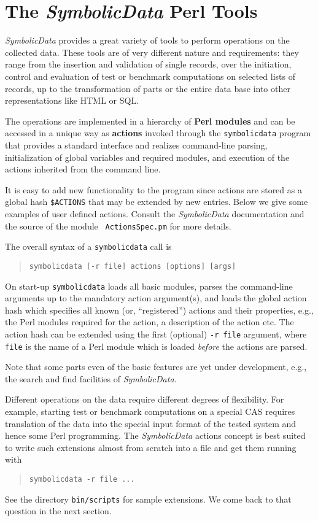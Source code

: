 \documentclass[11pt]{article}
\newcommand{\SD}{{\em Symbo\-lic\-Data}}
\begin{document}
\section{The {\SD} Perl Tools}

{\SD} provides a great variety of tools to perform operations on the
collected data. These tools are of very different nature and
requirements: they range from the insertion and validation of single
records, over the initiation, control and evaluation of test or
benchmark computations on selected lists of records, up to the
transformation of parts or the entire data base into other
representations like HTML or SQL.

The operations are implemented in a hierarchy of {\bf Perl modules}
and can be accessed in a unique way as {\bf actions} invoked through
the {\tt symbolicdata} program that provides a standard interface and
realizes command-line parsing, initialization of global variables and
required modules, and execution of the actions inherited from the
command line.

It is easy to add new functionality to the program since actions are
stored as a global hash {\tt \$ACTIONS} that may be extended by new
entries.  Below we give some examples of user defined actions.
Consult the {\SD} documentation and the source of the module {\tt
ActionsSpec.pm} for more details.

The overall syntax of a {\tt symbolicdata} call is
\begin{quote}
\mbox{\tt symbolicdata [-r file] actions [options] [args]}
\end{quote}

On start-up {\tt symbolicdata} loads all basic modules, parses
the command-line arguments up to the mandatory action
argument(s), and loads the global action hash which specifies all
known (or, ``registered'') actions and their properties, e.g.,
the Perl modules required for the action, a description of the
action etc. The action hash can be extended using the first
(optional) {\tt -r file} argument, where {\tt file} is the name
of a Perl module which is loaded {\em before} the actions are
parsed.  

Note that some parts even of the basic features are yet
under development, e.g., the search and find facilities of \SD.

Different operations on the data require different degrees of
flexibility. For example, starting test or benchmark computations
on a special CAS requires translation of the data into the
special input format of the tested system and hence some Perl
programming.  The {\SD} actions concept is best suited to write
such extensions almost from scratch into a file and get them
running with 
\begin{quote}
{\tt symbolicdata -r file ...}
\end{quote}
See the directory {\tt bin/scripts} for sample extensions.  We
come back to that question in the next section.
\end{document}
